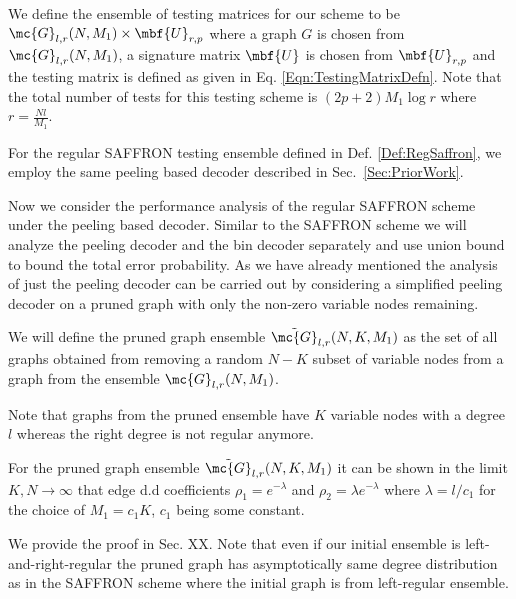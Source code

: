 \documentclass[conference,twocolumn]{IEEEtran}
\begin{document}
\begin{definition}
\label{Def:RegSaffron}
We define the ensemble of testing matrices for our scheme to be $\mc{G}_{l,r}(N,M_1)\times \mbf{U}_{r,p}$ where a graph $G$ is chosen from $\mc{G}_{l,r}(N,M_1)$, a signature matrix $\mbf{U}$ is chosen from $\mbf{U}_{r,p}$ and the testing matrix is defined as given in Eq. \eqref{Eqn:TestingMatrixDefn}. Note that the total number of tests for this testing scheme is $(2p+2)M_1\log r$ where $r=\frac{Nl}{M_1}$.
\end{definition}

For the regular SAFFRON testing ensemble defined in Def. \ref{Def:RegSaffron}, we employ the same peeling based decoder described in Sec.~\ref{Sec:PriorWork}. 

Now we consider the performance analysis of the regular SAFFRON scheme under the peeling based decoder. Similar to the SAFFRON scheme we will analyze the peeling decoder and the bin decoder separately and use union bound to bound the total error probability. As we have already  mentioned the analysis of just the peeling decoder can be carried out by considering a simplified peeling decoder on a pruned graph with only the non-zero variable nodes remaining. 

\begin{definition}
We will define the pruned graph ensemble $\tilde{\mc{G}}_{l,r}(N,K,M_1)$ as the set of all graphs obtained from removing a random $N-K$ subset of variable nodes from a graph from the ensemble $\mc{G}_{l,r}(N,M_1)$.
\end{definition}

Note that graphs from the pruned ensemble have $K$ variable nodes with a degree $l$ whereas the right degree is not regular anymore. 

\begin{lemma}
\label{Lem:EdgeDDPrunedGraph}
For the pruned graph ensemble $\tilde{\mc{G}}_{l,r}(N,K,M_1)$ it can be shown in the limit $K,N\rightarrow\infty$ that edge d.d coefficients $\rho_{1}=e^{-\lambda}$ and $\rho_{2}=\lambda e^{-\lambda}$ where $\lambda=l/c_1$ for the choice of $M_1=c_1K$, $c_1$ being some constant.
\end{lemma}

We provide the proof in Sec. XX. Note that even if our initial ensemble is left-and-right-regular the pruned graph has asymptotically same degree distribution as in the SAFFRON scheme where the initial graph is from left-regular ensemble.
\end{document}
